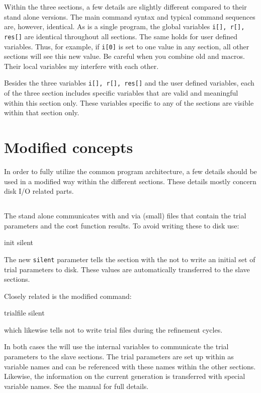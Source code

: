 Within the three sections, a few details are slightly different compared to 
their stand alone versions. The main command syntax and typical command 
sequences are, however, identical. As \Suite is a single program, the 
global variables {\tt i[], r[], res[]} are identical throughout all 
sections. The same holds for user defined variables. Thus, for example,
if {\tt i[0]} is set to one value in any section, all other sections will
see this new value. Be careful when you combine old \Discus and \Kuplot 
macros. Their local variables my interfere with each other. 

Besides the three variables {\tt i[], r[], res[]} and the user defined
variables, each of the three section includes specific variables that are
valid and meaningful within this section only. These variables 
specific to any of the sections are visible within that section only.

\section{Modified concepts}

In order to fully utilize the common program architecture, a few details
should be used in a modified way within the different sections. These details
mostly concern disk I/O related parts. 


\subsection{\diffev}

The stand alone \Diffev communicates with \Discus and \Kuplot via (small) 
files that contain the trial parameters and the cost function results.
To avoid writing these to disk use:
\begin{MacVerbatim}
  init silent
\end{MacVerbatim}
The new {\tt silent} parameter tells the \Diffev section with the \Suite 
not to write an initial set of
trial parameters to disk. These values are automatically transferred to the 
slave sections.

Closely related is the modified command:
\begin{MacVerbatim}
  trialfile silent
\end{MacVerbatim}
which likewise tells \Diffev not to write trial files during the refinement
cycles.

In both cases the \Suite will use the internal variables 
to communicate the trial parameters to the slave sections. 
The trial parameters are set up within 
\href{./diffev\_man.pdf}\Diffev as variable names and can 
be referenced with these names within the other sections.
Likewise, the information on the current generation is transferred with 
special variable names. See the 
\href{./diffev\_man.pdf}{\Diffev}  
manual for full details.

